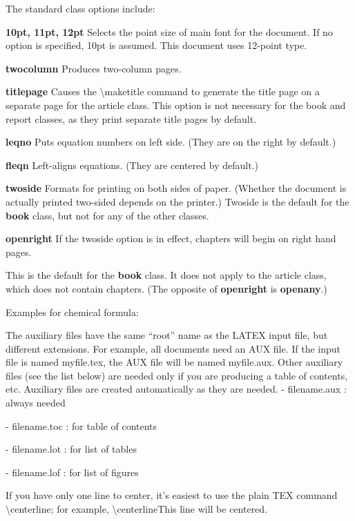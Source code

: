 \documentclass[12pt,openright]{book}
\begin{document}
The standard class options include:

\textbf{10pt, 11pt, 12pt} Selects the point size of main font for the document. If no option is specified, 10pt is assumed. This document uses 12-point type.

\textbf{twocolumn} Produces two-column pages.

\textbf{titlepage} Causes the \textbackslash maketitle command to generate the title page on a separate page for the article class. This option is not necessary for the book and report
classes, as they print separate title pages by default.

\textbf{leqno} Puts equation numbers on left side. (They are on the right by default.)

\textbf{fleqn} Left-aligns equations. (They are centered by default.)

\textbf{twoside} Formats for printing on both sides of paper. (Whether the document is actually printed two-sided depends on the printer.) Twoside is the default for the \textbf{book} class, but not for any of the other classes.

\textbf{openright} If the twoside option is in effect, chapters will begin on right hand pages.

This is the default for the \textbf{book} class. It does not apply to the article class,
which does not contain chapters. (The opposite of \textbf{openright} is \textbf{openany}.)


\noindent Examples for chemical formula:
\vskip 0.1in



\vskip 0.1in
The auxiliary files have the same “root” name as the LATEX input file, but different
extensions. For example, all documents need an AUX file. If the input file is named
myfile.tex, the AUX file will be named myfile.aux. Other auxiliary files (see the list
below) are needed only if you are producing a table of contents, etc. Auxiliary files are
created automatically as they are needed.
\vskip 0.1in
- filename.aux : always needed

- filename.toc : for table of contents

- filename.lot : for list of tables

- filename.lof : for list of figures

\vskip 0.1in
If you have only one line to center, it’s easiest to use the plain TEX command
\textbackslash centerline; for example,
\textbackslash centerline{This line will be centered}.
\end{document}
